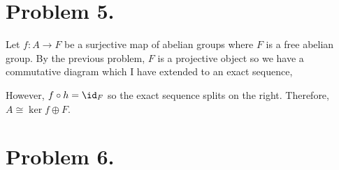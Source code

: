 \documentclass[12pt]{extarticle}
\begin{document}
\section*{Problem 5.}

Let $f : A \to F$ be a surjective map of abelian groups where $F$ is a free abelian group. By the previous problem, $F$ is a projective object so we have a commutative diagram which I have extended to an exact sequence,
\begin{center}
\end{center}
However, $f \circ h = \id_F$ so the exact sequence splits on the right. Therefore, $A \cong \ker{f} \oplus F$. 

\section*{Problem 6.}
\end{document}
